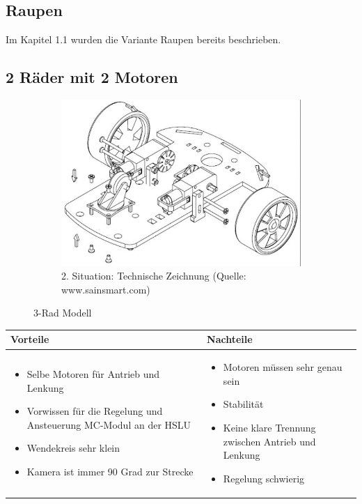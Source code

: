 \subsection{Raupen}
Im Kapitel 1.1 wurden die Variante Raupen bereits beschrieben.


\subsection{2 Räder mit 2 Motoren}

\begin{figure} [hbp]
	\centering
	\begin{subfigure}[b]{0.36\textwidth}
		\includegraphics[width=\textwidth]{fig/3rad-3.JPG}
		\caption{2. Situation: Technische Zeichnung
		(Quelle: www.sainsmart.com)}
\end{subfigure}
	\caption{3-Rad Modell}\label{fig:animals}
\end{figure}


\begin{table}[h]
\begin{tabular}{p{} | p{}}


 \textbf{Vorteile} & \textbf{Nachteile} \\ \hline
	 
\begin{itemize}
\item Selbe Motoren für Antrieb und Lenkung
\item Vorwissen für die Regelung und Ansteuerung MC-Modul an der HSLU
\item Wendekreis sehr klein
\item Kamera ist immer 90 Grad zur Strecke
\end{itemize}

 
 &
 
\begin{itemize}
\item Motoren müssen sehr genau sein
\item Stabilität
\item Keine klare Trennung zwischen Antrieb und Lenkung
\item Regelung schwierig
\end{itemize}

\end{tabular}
\end{table}

